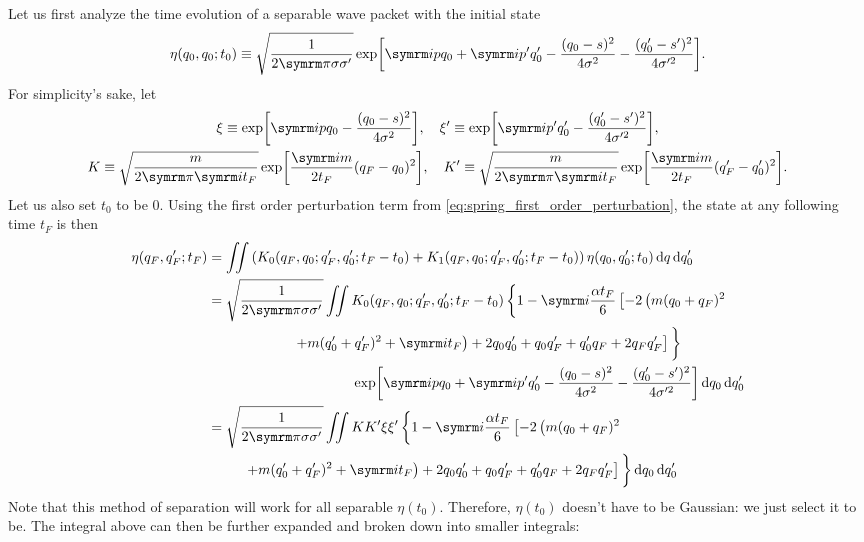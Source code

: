 Let us first analyze the time evolution of a separable wave packet with the initial state
\begin{equation}
    \eta(q_0, q_0; t_0) \equiv \sqrt{\frac{1}{2\cpi\sigma\sigma'}}\exp[\im pq_0 + \im p'q_0' - \frac{(q_0 - s)^2}{4\sigma^2} - \frac{(q_0' - s')^2}{4\sigma'^2}].
\end{equation}
For simplicity's sake, let
\begin{gather*}
    \xi \equiv \exp[\im pq_0 - \frac{(q_0 - s)^2}{4\sigma^2}], \quad \xi' \equiv \exp[\im p'q_0' - \frac{(q_0' - s')^2}{4\sigma'^2}], \\
    K \equiv \sqrt{\frac{m}{2\cpi\im t_F}}\exp[\frac{\im m}{2t_F}(q_F - q_0)^2], \quad K' \equiv \sqrt{\frac{m}{2\cpi\im t_F}}\exp[\frac{\im m}{2t_F}(q_F' - q_0')^2].
\end{gather*}
Let us also set $t_0$ to be $0$. Using the first order perturbation term from \cref{eq:spring_first_order_perturbation}, the state at any following time $t_F$ is then
\begin{align}
    \eta(q_F, q_F'; t_F) &= \iint\left(K_0(q_F, q_0; q_F', q_0'; t_F - t_0) + K_1(q_F, q_0; q_F', q_0'; t_F - t_0)\right)\eta(q_0, q_0'; t_0)\dd{q}\dd{q_0'} \\
    &= \begin{multlined}[t]
        \sqrt{\frac{1}{2\cpi\sigma\sigma'}}\iint K_0(q_F, q_0; q_F', q_0'; t_F - t_0)\left\{1 - \im\frac{\alpha t_F}{6}\left[-2\left(m(q_0 + q_F)^2 \right.\right.\right.\\
        \left.\left.\left. + m(q_0' + q_F')^2 + \im t_F\right) + 2q_0q_0' + q_0q_F' + q_0'q_F + 2q_Fq_F'\right]\vphantom{\frac{\alpha t_F}{6}}\right\}
        \\ \exp[\im pq_0 + \im p'q_0' - \frac{(q_0 - s)^2}{4\sigma^2} - \frac{(q_0' - s')^2}{4\sigma'^2}]\dd{q_0}\dd{q_0'}
    \end{multlined} \\
    &= \begin{multlined}[t]
        \sqrt{\frac{1}{2\cpi\sigma\sigma'}}\iint KK'\xi\xi'\left\{1 - \im\frac{\alpha t_F}{6}\left[-2\left(m(q_0 + q_F)^2 \right.\right.\right.\\
        \left.\left.\left. + m(q_0' + q_F')^2 + \im t_F\right) + 2q_0q_0' + q_0q_F' + q_0'q_F + 2q_Fq_F'\right]\vphantom{\frac{\alpha t_F}{6}}\right\} \dd{q_0}\dd{q_0'}
    \end{multlined}
\end{align}
Note that this method of separation will work for all separable $\eta(t_0)$. Therefore, $\eta(t_0)$ doesn't have to be Gaussian: we just select it to be. The integral above can then be further expanded and broken down into smaller integrals:
